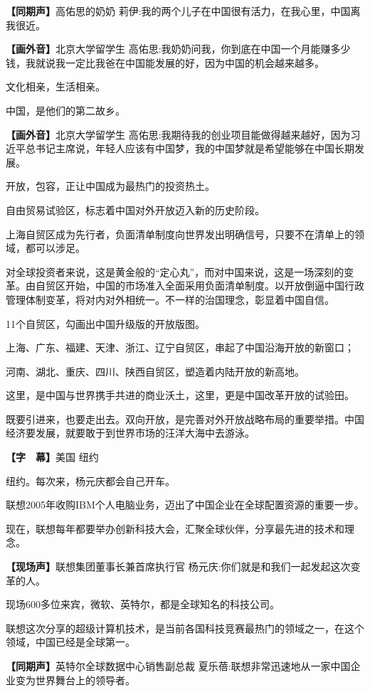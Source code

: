 \documentclass{ctexart}
\newcommand{\zkh}[1]{\textbf{\hspace{-2.7em} 【#1】}}
\begin{document}
\zkh{同期声}高佑思的奶奶 莉伊:我的两个儿子在中国很有活力，在我心里，中国离我很近。

\zkh{画外音}北京大学留学生 高佑思:我奶奶问我，你到底在中国一个月能赚多少钱，我就说我一定比我爸在中国能发展的好，因为中国的机会越来越多。

文化相亲，生活相亲。

中国，是他们的第二故乡。

\zkh{画外音}北京大学留学生 高佑思:我期待我的创业项目能做得越来越好，因为习近平总书记主席说，年轻人应该有中国梦，我的中国梦就是希望能够在中国长期发展。

开放，包容，正让中国成为最热门的投资热土。

自由贸易试验区，标志着中国对外开放迈入新的历史阶段。

上海自贸区成为先行者，负面清单制度向世界发出明确信号，只要不在清单上的领域，都可以涉足。

对全球投资者来说，这是黄金般的``定心丸''，而对中国来说，这是一场深刻的变革。由自贸区开始，中国的市场准入全面采用负面清单制度。以开放倒逼中国行政管理体制变革，将对内对外相统一。不一样的治国理念，彰显着中国自信。

11个自贸区，勾画出中国升级版的开放版图。

上海、广东、福建、天津、浙江、辽宁自贸区，串起了中国沿海开放的新窗口；

河南、湖北、重庆、四川、陕西自贸区，塑造着内陆开放的新高地。

这里，是中国与世界携手共进的商业沃土，这里，更是中国改革开放的试验田。

既要引进来，也要走出去。双向开放，是完善对外开放战略布局的重要举措。中国经济要发展，就要敢于到世界市场的汪洋大海中去游泳。

\zkh{字　幕}美国 纽约

纽约。每次来，杨元庆都会自己开车。

联想2005年收购IBM个人电脑业务，迈出了中国企业在全球配置资源的重要一步。

现在，联想每年都要举办创新科技大会，汇聚全球伙伴，分享最先进的技术和理念。

\zkh{现场声}联想集团董事长兼首席执行官 杨元庆:你们就是和我们一起发起这次变革的人。

现场600多位来宾，微软、英特尔，都是全球知名的科技公司。

联想这次分享的超级计算机技术，是当前各国科技竞赛最热门的领域之一，在这个领域，中国已经是全球第一。

\zkh{同期声}英特尔全球数据中心销售副总裁 夏乐蓓:联想非常迅速地从一家中国企业变为世界舞台上的领导者。
\end{document}
